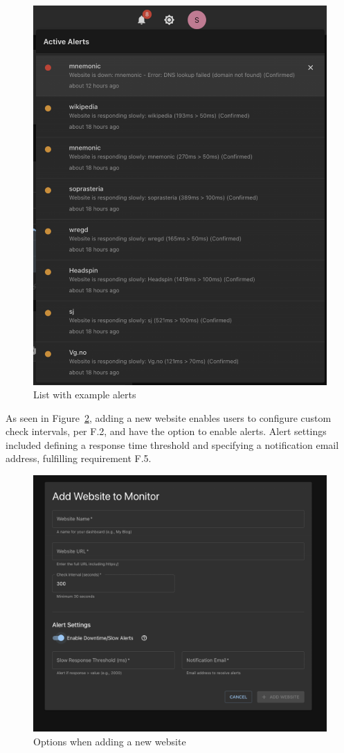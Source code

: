 \begin{figure}[H]
    \centering
    \includegraphics[width=0.65\linewidth]{figures/MVP-dashboard/MVP-only_alertlist.png}
    \caption{List with example alerts}
    \label{fig:alertlist}
\end{figure}

As seen in Figure~\ref{fig:mvpaddwebsite}, adding a new website enables users to configure custom check intervals, per F.2, and have the option to enable alerts. Alert settings included defining a response time threshold and specifying a notification email address, fulfilling requirement F.5. 

\begin{figure}[H]
    \centering
    \includegraphics[width=0.6\linewidth]{figures/MVP-dashboard/MVP-addwebsite.png}
    \caption{Options when adding a new website}
    \label{fig:mvpaddwebsite}
\end{figure}




